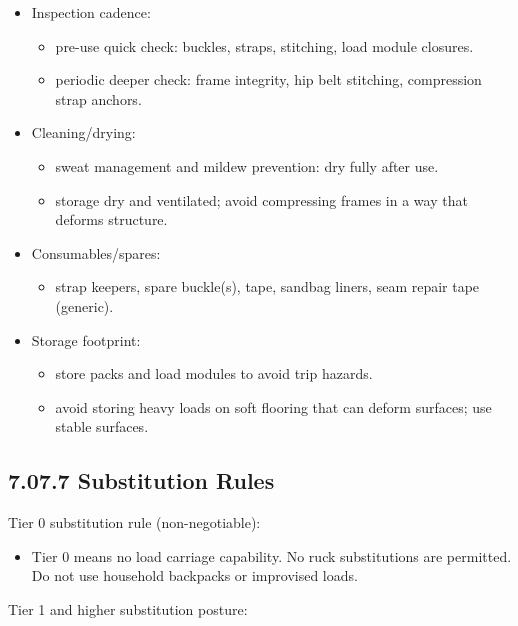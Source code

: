\documentclass[10pt]{article}
\begin{document}
\begin{itemize}
\item Inspection cadence:
  \begin{itemize}
  \item pre-use quick check: buckles, straps, stitching, load module closures.
  \item periodic deeper check: frame integrity, hip belt stitching, compression strap anchors.
  \end{itemize}
\item Cleaning/drying:
  \begin{itemize}
  \item sweat management and mildew prevention: dry fully after use.
  \item storage dry and ventilated; avoid compressing frames in a way that deforms structure.
  \end{itemize}
\item Consumables/spares:
  \begin{itemize}
  \item strap keepers, spare buckle(s), tape, sandbag liners, seam repair tape (generic).
  \end{itemize}
\item Storage footprint:
  \begin{itemize}
  \item store packs and load modules to avoid trip hazards.
  \item avoid storing heavy loads on soft flooring that can deform surfaces; use stable surfaces.
  \end{itemize}
\end{itemize}

\subsection*{7.07.7 Substitution Rules}
{}

Tier 0 substitution rule (non-negotiable):

\begin{itemize}
\item Tier 0 means no load carriage capability. No ruck substitutions are permitted. Do not use household backpacks or improvised loads.
\end{itemize}

Tier 1 and higher substitution posture:
\end{document}
